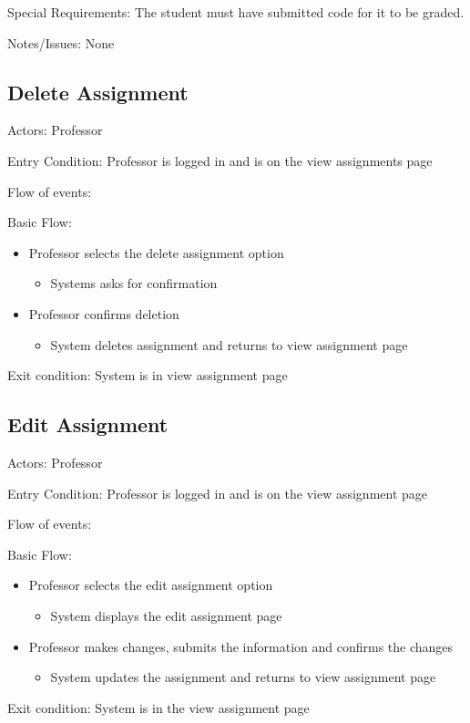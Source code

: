 Special Requirements: The student must have submitted code for 
it to be graded.

Notes/Issues: None

\subsection*{Delete Assignment}\label{section:h.gw7q7yjp1gn9}
Actors: Professor

Entry Condition: Professor is logged in and is on the view 
assignments page

Flow of events:

Basic Flow:

\begin{itemize}
\item Professor selects the delete assignment option
\begin{itemize}
\item Systems asks for confirmation
\end{itemize}
\item Professor confirms deletion
\begin{itemize}
\item System deletes assignment and returns to view assignment page
\end{itemize}
\end{itemize}
Exit condition: System is in view assignment page

\subsection*{Edit Assignment}\label{section:h.bdm7ybz2uvl4}
Actors: Professor

Entry Condition: Professor is logged in and is on the view 
assignment page

Flow of events:

Basic Flow:

\begin{itemize}
\item Professor selects the edit assignment option
\begin{itemize}
\item System displays the edit assignment page
\end{itemize}
\item Professor makes changes, submits the information and confirms the 
changes
\begin{itemize}
\item System updates the assignment and returns to view assignment page
\end{itemize}
\end{itemize}
Exit condition: System is in the view assignment page

